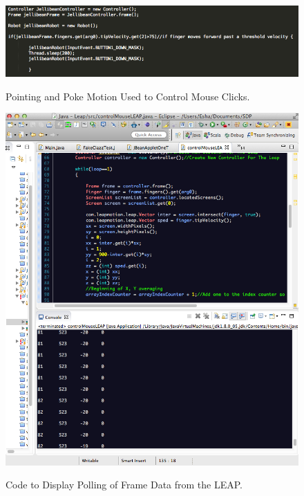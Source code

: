 \documentclass[a4paper, 11pt]{article}
\begin{document}
\begin{figure}[H]
\begin{center}
\includegraphics[scale=0.5]{leapCode}\\
\caption{Pointing and Poke Motion Used to Control Mouse Clicks.}
\label{leapCode}
\end{center}
\end{figure}

\begin{figure}[H]
\begin{center}
\includegraphics[scale=0.5]{LEAPPollingFrames}\\
\caption{Code to Display Polling of Frame Data from the LEAP.}
\label{LEAPPollingFrames}
\end{center}
\end{figure}
\end{document}
